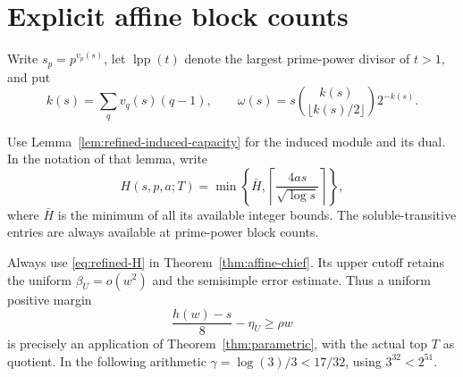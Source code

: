 \section{Explicit affine block counts}
\label{sec:block-capacities}
Write $s_p=p^{v_p(s)}$, let $\operatorname{lpp}(t)$ denote the
largest prime-power divisor of $t>1$, and put
\[
 k(s)=\sum_qv_q(s)(q-1),\qquad
 \omega(s)=s\binom{k(s)}{\lfloor k(s)/2\rfloor}2^{-k(s)}.
\]

Use Lemma~\ref{lem:refined-induced-capacity} for the induced module
and its dual. In the notation of that lemma, write
\begin{equation}\label{eq:refined-H}
 H(s,p,a;T)=\min\left\{\bar H,
             \left\lceil\frac{4as}{\sqrt{\log s}}\right\rceil\right\},
\end{equation}
where $\bar H$ is the minimum of all its available integer bounds.
The soluble-transitive entries are always available at prime-power
block counts.

Always use \eqref{eq:refined-H} in
Theorem~\ref{thm:affine-chief}. Its upper cutoff retains the uniform
$\beta_U=o(w^2)$ and the semisimple error estimate. Thus a uniform
positive margin
\begin{equation}\label{eq:block-margin}
 \frac{h(w)-s}{8}-\eta_U\geq\rho w
\end{equation}
is precisely an application of Theorem~\ref{thm:parametric}, with
the actual top $T$ as quotient. In the following arithmetic
$\gamma=\log(3)/3<17/32$, using $3^{32}<2^{51}$.

